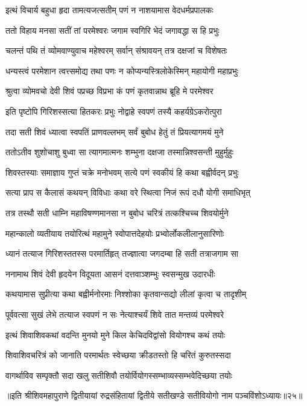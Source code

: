 \twolineshloka
{इत्थं विचार्य बहुधा हृदा तामत्यजत्सतीम्}
{पणं न नाशयामास वेदधर्मप्रपालकः} %

\twolineshloka
{ततो विहाय मनसा सतीं तां परमेश्वरः}
{जगाम स्वगिरि भेदं जगावद्धा स हि प्रभुः} %

\twolineshloka
{चलन्तं पथि तं व्योमवाण्युवाच महेश्वरम्}
{सर्वान् संश्रावयन् तत्र दक्षजां च विशेषतः} %


\twolineshloka
{धन्यस्त्वं परमेशान त्वत्त्समोद्य तथा पणः}
{न कोप्यन्यस्त्रिलोकेस्मिन् महायोगी महाप्रभुः} %


\twolineshloka
{श्रुत्वा व्योमवचो देवी शिवं पप्रच्छ विप्रभा}
{कं पणं कृतवान्नाथ ब्रूहि मे परमेश्वर} %

\twolineshloka
{इति पृष्टोपि गिरिशस्सत्या हितकरः प्रभुः}
{नोद्वाहे स्वपणं तस्यै कहर्यग्रेऽकरोत्पुरा} %

\twolineshloka
{तदा सती शिवं ध्यात्वा स्वपतिं प्राणवल्लभम्}
{सर्वं बुबोध हेतुं तं प्रियत्यागमयं मुने} %

\twolineshloka
{ततोऽतीव शुशोचाशु बुध्वा सा त्यागमात्मनः}
{शम्भुना दक्षजा तस्मान्निश्वसन्ती मुहुर्मुहुः} %

\twolineshloka
{शिवस्तस्याः समाज्ञाय गुप्तं चक्रे मनोभवम्}
{सत्ये पणं स्वकीयं हि कथा बह्वीर्वदन् प्रभुः} %

\twolineshloka
{सत्या प्राप स कैलासं कथयन् विविधाः कथा}
{वरे स्थित्वा निजं रूपं दधौ योगी समाधिभृत्} %

\twolineshloka
{तत्र तस्थौ सती धाम्नि महाविषण्णमानसा}
{न बुबोध चरित्रं तत्कश्चिच्च शिवयोर्मुने} %

\twolineshloka
{महान्कालो व्यतीयाय तयोरित्थं महामुने}
{स्वोपात्तदेहयोः प्रभ्वोर्लोकलीलानुसारिणोः} %

\twolineshloka
{ध्यानं तत्याज गिरिशस्ततस्स परमार्तिहृत्}
{तज्ज्ञात्वा जगदम्बा हि सती तत्राजगाम सा} %

\twolineshloka
{ननामाथ शिवं देवी हृदयेन विदूयता}
{आसनं दत्तवाञ्शम्भुः स्वसन्मुख उदारधीः} %

\twolineshloka
{कथयामास सुप्रीत्या कथा बह्वीर्मनोरमाः}
{निश्शोका कृतवान्सद्यो लीलां कृत्वा च तादृशीम्} %

\twolineshloka
{पूर्ववत्सा सुखं लेभे तत्याज स्वपणं न सः}
{नेत्याश्चर्यं शिवे तात मन्तव्यं परमेश्वरे} %

\twolineshloka
{इत्थं शिवाशिवकथां वदन्ति मुनयो मुने}
{किल केचिदविद्वांसो वियोगश्च कथं तयोः} %

\twolineshloka
{शिवाशिवचरित्रं को जानाति परमार्थतः}
{स्वेच्छया क्रीडतस्तो हि चरितं कुरुतस्सदा} %

\twolineshloka
{वागर्थाविव सम्पृक्तौ सदा खलु सतीशिवौ}
{तयोर्वियोगस्सम्भाव्यस्सम्भवेदिच्छया तयोः} %

॥इति श्रीशिवमहापुराणे द्वितीयायां रुद्रसंहितायां द्वितीये सतीखण्डे सतीवियोगो नाम पञ्चविंशोऽध्यायः॥२५॥

\closesection